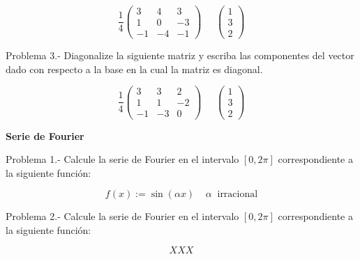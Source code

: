 \documentclass{article}
\begin{document}
\begin{equation}
  \frac{1}{4}\left( 
    \begin{array}{ccc}
         3 & 4 &  3 \\
         1 & 0 & -3 \\
         -1 & -4 &  -1
    \end{array}
    \right)
    \;\;\;\;\;
    \left( 
    \begin{array}{c}
          1  \\
          3  \\
          2  
    \end{array}
    \right)
\end{equation}


Problema 3.- Diagonalize la siguiente matriz y escriba las componentes
del vector dado con respecto a la base en la cual la matriz es diagonal.

\begin{equation}
  \frac{1}{4}\left( 
    \begin{array}{ccc}
          3 & 3 & 2 \\
          1 & 1 & -2 \\
          -1 & -3 & 0  
    \end{array}
    \right)
    \;\;\;\;\;
    \left( 
    \begin{array}{c}
          1  \\
          3  \\
          2  
    \end{array}
    \right)
\end{equation}
\vspace{1cm}


\begin{center}
  \textbf{Serie de Fourier}
\end{center}
\vspace{1cm}

Problema 1.- Calcule la serie de Fourier en el intervalo $[0,2\pi]$ 
correspondiente a la siguiente funci\'on:

\begin{equation}
  f(x) := \sin(\alpha x) \;\;\;\; \alpha \;\; \mbox{irracional}
\end{equation}


Problema 2.- Calcule la serie de Fourier en el intervalo $[0,2\pi]$ 
correspondiente a la siguiente funci\'on:

\begin{equation}
XXX 
\end{equation}
\end{document}
